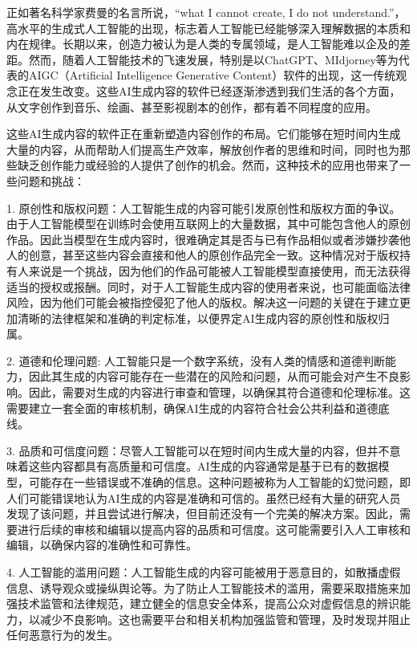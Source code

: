 正如著名科学家费曼的名言所说，“what I cannot create, I do not understand.”，高水平的生成式人工智能的出现，标志着人工智能已经能够深入理解数据的本质和内在规律。长期以来，创造力被认为是人类的专属领域，是人工智能难以企及的差距。然而，随着人工智能技术的飞速发展，特别是以ChatGPT、MIdjorney等为代表的AIGC（Artificial Intelligence Generative Content）软件的出现，这一传统观念正在发生改变。这些AI生成内容的软件已经逐渐渗透到我们生活的各个方面，从文字创作到音乐、绘画、甚至影视剧本的创作，都有着不同程度的应用。

这些AI生成内容的软件正在重新塑造内容创作的布局。它们能够在短时间内生成大量的内容，从而帮助人们提高生产效率，解放创作者的思维和时间，同时也为那些缺乏创作能力或经验的人提供了创作的机会。然而，这种技术的应用也带来了一些问题和挑战：

1. 原创性和版权问题：人工智能生成的内容可能引发原创性和版权方面的争议。由于人工智能模型在训练时会使用互联网上的大量数据，其中可能包含他人的原创作品。因此当模型在生成内容时，很难确定其是否与已有作品相似或者涉嫌抄袭他人的创意，甚至这些内容会直接和他人的原创作品完全一致。这种情况对于版权持有人来说是一个挑战，因为他们的作品可能被人工智能模型直接使用，而无法获得适当的授权或报酬。同时，对于人工智能生成内容的使用者来说，也可能面临法律风险，因为他们可能会被指控侵犯了他人的版权。解决这一问题的关键在于建立更加清晰的法律框架和准确的判定标准，以便界定AI生成内容的原创性和版权归属。

2. 道德和伦理问题: 人工智能只是一个数字系统，没有人类的情感和道德判断能力，因此其生成的内容可能存在一些潜在的风险和问题，从而可能会对产生不良影响。因此，需要对生成的内容进行审查和管理，以确保其符合道德和伦理标准。这需要建立一套全面的审核机制，确保AI生成的内容符合社会公共利益和道德底线。

3. 品质和可信度问题：尽管人工智能可以在短时间内生成大量的内容，但并不意味着这些内容都具有高质量和可信度。AI生成的内容通常是基于已有的数据模型，可能存在一些错误或不准确的信息。这种问题被称为人工智能的幻觉问题，即人们可能错误地认为AI生成的内容是准确和可信的。虽然已经有大量的研究人员发现了该问题，并且尝试进行解决，但目前还没有一个完美的解决方案。因此，需要进行后续的审核和编辑以提高内容的品质和可信度。这可能需要引入人工审核和编辑，以确保内容的准确性和可靠性。

4. 人工智能的滥用问题：人工智能生成的内容可能被用于恶意目的，如散播虚假信息、诱导观众或操纵舆论等。为了防止人工智能技术的滥用，需要采取措施来加强技术监管和法律规范，建立健全的信息安全体系，提高公众对虚假信息的辨识能力，以减少不良影响。这也需要平台和相关机构加强监管和管理，及时发现并阻止任何恶意行为的发生。

